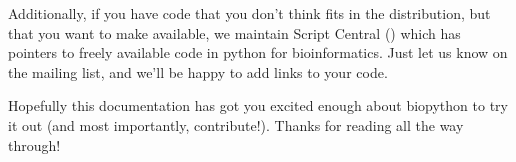 \documentclass{report}
\begin{document}
Additionally, if you have code that you don't think fits in the distribution, but that you want to make available, we maintain Script Central () which has pointers to freely available code in python for bioinformatics. Just let us know on the mailing list, and we'll be happy to add links to your code.


Hopefully this documentation has got you excited enough about biopython to try it out (and most importantly, contribute!). Thanks for reading all the way through!
\end{document}
